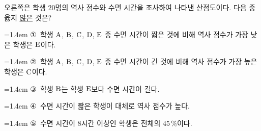 \noindent\begin{minipage}[t]{0.58\linewidth}\vspace{0pt}\raggedright 오른쪽은 학생 $20$명의 역사 점수와 수면 시간을 조사하여 나타낸 산점도이다. 다음 중 옳지 \underline{않은} 것은?\end{minipage}\hfill\begin{minipage}[t]{0.4\linewidth}\vspace{0pt}\centering \resizebox{\ifdim\width>\linewidth\linewidth\else\width\fi}{!}{}\end{minipage}\par
\par\medskip\par\noindent\hangindent=1.4em {\small ①}\ 학생 $\mathrm{A}$, $\mathrm{B}$, $\mathrm{C}$, $\mathrm{D}$, $\mathrm{E}$ 중 수면 시간이 짧은 것에 비해 역사 점수가 가장 낮은 학생은 $\mathrm{E}$이다.\par\noindent\hangindent=1.4em {\small ②}\ 학생 $\mathrm{A}$, $\mathrm{B}$, $\mathrm{C}$, $\mathrm{D}$, $\mathrm{E}$ 중 수면 시간이 긴 것에 비해 역사 점수가 가장 높은 학생은 $\mathrm{C}$이다.\par\noindent\hangindent=1.4em {\small ③}\ 학생 $\mathrm{B}$는 학생 $\mathrm{E}$보다 수면 시간이 길다.\par\noindent\hangindent=1.4em {\small ④}\ 수면 시간이 짧은 학생이 대체로 역사 점수가 높다.\par\noindent\hangindent=1.4em {\small ⑤}\ 수면 시간이 $8$시간 이상인 학생은 전체의 $45\,\%$이다.\par\medskip
